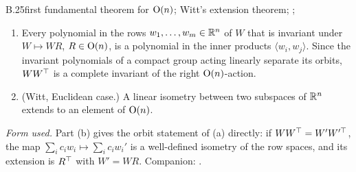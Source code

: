 \begin{auxresult}{B.25}{first fundamental theorem for $\mathrm{O}(n)$; Witt's extension theorem}{\citep[Ch.~II]{xweyl1939classical};
\citep[Ch.~5]{xgoodman2009symmetry}; \citep[Ch.~III]{xartin1957geometric}}
\begin{enumerate}[label=(\alph*)]
  \item Every polynomial in the rows $w_1,\dots,w_m\in\mathbb{R}^n$ of $W$ that is invariant under $W\mapsto WR$, $R\in\mathrm{O}(n)$,
    is a polynomial in the inner products $\langle w_i,w_j\rangle$. Since the invariant polynomials of a compact group
    acting linearly separate its orbits, $WW^{\top}$ is a complete invariant of the right $\mathrm{O}(n)$-action.
  \item (Witt, Euclidean case.) A linear isometry between two subspaces of $\mathbb{R}^n$ extends to an element of $\mathrm{O}(n)$.
\end{enumerate}
\end{auxresult}
\noindent\emph{Form used.} Part (b) gives the orbit statement of (a) directly: if $WW^{\top}=W'W'^{\top}$, the map
$\sum_ic_iw_i\mapsto\sum_ic_iw_i'$ is a well-defined isometry of the row spaces, and its extension is $R^{\top}$ with $W'=WR$.
Companion: .

